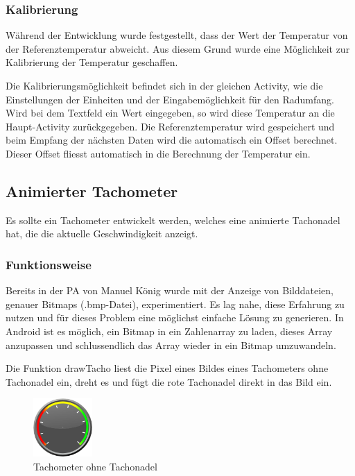 
\subsubsection{Kalibrierung}

Während der Entwicklung wurde festgestellt, dass der Wert der Temperatur von der Referenztemperatur abweicht. Aus diesem Grund wurde eine Möglichkeit zur Kalibrierung der Temperatur geschaffen.

Die Kalibrierungsmöglichkeit befindet sich in der gleichen Activity, wie die Einstellungen der Einheiten und der Eingabemöglichkeit für den Radumfang. Wird bei dem Textfeld ein Wert eingegeben, so wird diese Temperatur an die Haupt-Activity zurückgegeben. Die Referenztemperatur wird gespeichert und beim Empfang der nächsten Daten wird die automatisch ein Offset berechnet. Dieser Offset fliesst automatisch in die Berechnung der Temperatur ein.

\subsection{Animierter Tachometer}

Es sollte ein Tachometer entwickelt werden, welches eine animierte Tachonadel hat, die die aktuelle Geschwindigkeit anzeigt.

\subsubsection{Funktionsweise}

Bereits in der PA von Manuel König wurde mit der Anzeige von Bilddateien, genauer Bitmaps (.bmp-Datei), experimentiert. Es lag nahe, diese Erfahrung zu nutzen und für dieses Problem eine möglichst einfache Lösung zu generieren. In Android ist es möglich, ein Bitmap in ein Zahlenarray zu laden, dieses Array anzupassen und schlussendlich das Array wieder in ein Bitmap umzuwandeln.

Die Funktion drawTacho liest die Pixel eines Bildes eines Tachometers ohne Tachonadel ein, dreht es und fügt die rote Tachonadel direkt in das Bild ein.

\begin{figure}[ht]
    \includegraphics[width=0.2\textwidth]{3Vorgehen/imag/tachometer.png}
    \caption{Tachometer ohne Tachonadel}
	\label{tachometer} 
\end{figure}

